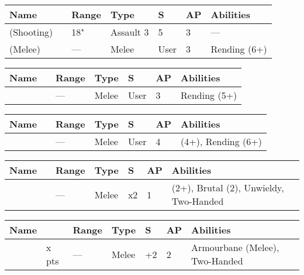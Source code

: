 
 \label{Melee Weapons}

 \label{Staff of Light}
	\noindent
	\begin{tabular}{||m{110pt} m{30pt} m{31pt} m{55pt} m{12pt} m{12pt} m{210pt}||}
		\hline
		Name & & Range & Type & S & AP & Abilities \\
		\hline
		\quickref{Staff of Light} (Shooting) & & 18" & Assault 3 & 5 & 3 & — \\
		\quickref{Staff of Light} (Melee) & & — & Melee & User & 3 & Rending (6+) \\
		\hline
\end{tabular}

 \label{Hyperphase Sword}
\noindent
\begin{tabular}{||m{110pt} m{30pt} m{31pt} m{55pt} m{12pt} m{12pt} m{210pt}||}
	\hline
	Name & & Range & Type & S & AP & Abilities \\
	\hline
	\quickref{Hyperphase Sword} &  & — & Melee & User & 3 & Rending (5+) \\
	\hline
\end{tabular}

 \label{Voidblade}
\noindent
\begin{tabular}{||m{110pt} m{30pt} m{31pt} m{55pt} m{12pt} m{12pt} m{210pt}||}
	\hline
	Name & & Range & Type & S & AP & Abilities \\
	\hline
	\quickref{Voidblade} &  & — & Melee & User & 4 & \quickref{Entropic Strike} (4+), Rending (6+) \\
	\hline
\end{tabular}

 \label{Voidscythe}
\noindent
\begin{tabular}{||m{110pt} m{30pt} m{31pt} m{55pt} m{12pt} m{12pt} m{210pt}||}
	\hline
	Name & & Range & Type & S & AP & Abilities \\
	\hline
	\quickref{Voidscythe} &  & — & Melee & x2 & 1 & \quickref{Entropic Strike} (2+), Brutal (2), Unwieldy, Two-Handed \\
	\hline
\end{tabular}

\label{Warscythe}
\noindent
\begin{tabular}{||m{110pt} m{30pt} m{31pt} m{55pt} m{12pt} m{12pt} m{210pt}||}
	\hline
	Name & & Range & Type & S & AP & Abilities \\
	\hline
	\quickref{Warscythe} & x pts& — & Melee & +2 & 2 & Armourbane (Melee), Two-Handed \\
	\hline
\end{tabular}



